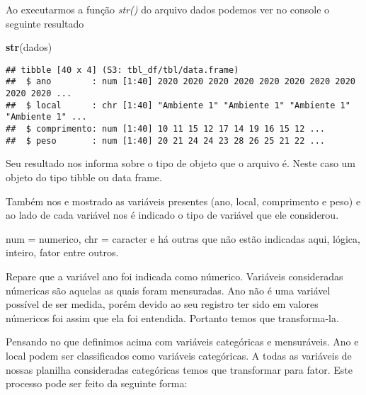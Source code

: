 \documentclass[]{book}
\newenvironment{Shaded}{\begin{snugshade}}{\end{snugshade}}
\newcommand{\KeywordTok}[1]{\textcolor[rgb]{0.13,0.29,0.53}{\textbf{#1}}}
\newcommand{\NormalTok}[1]{#1}
\newcommand{\OperatorTok}[1]{\textcolor[rgb]{0.81,0.36,0.00}{\textbf{#1}}}
\newcommand{\StringTok}[1]{\textcolor[rgb]{0.31,0.60,0.02}{#1}}
\begin{document}
Ao executarmos a função \emph{str()} do arquivo dados podemos ver no console o seguinte resultado

\begin{Shaded}
\begin{Highlighting}[]
\KeywordTok{str}\NormalTok{(dados)}
\end{Highlighting}
\end{Shaded}

\begin{verbatim}
## tibble [40 x 4] (S3: tbl_df/tbl/data.frame)
##  $ ano        : num [1:40] 2020 2020 2020 2020 2020 2020 2020 2020 2020 2020 ...
##  $ local      : chr [1:40] "Ambiente 1" "Ambiente 1" "Ambiente 1" "Ambiente 1" ...
##  $ comprimento: num [1:40] 10 11 15 12 17 14 19 16 15 12 ...
##  $ peso       : num [1:40] 20 21 24 24 23 28 26 25 21 22 ...
\end{verbatim}

Seu resultado nos informa sobre o tipo de objeto que o arquivo é. Neste caso um objeto do tipo tibble ou data frame.

Também nos e mostrado as variáveis presentes (ano, local, comprimento e peso) e ao lado de cada variável nos é indicado o tipo de variável que ele considerou.

num = numerico, chr = caracter e há outras que não estão indicadas aqui, lógica, inteiro, fator entre outros.

Repare que a variável ano foi indicada como númerico. Variáveis consideradas númericas são aquelas as quais foram mensuradas. Ano não é uma variável possível de ser medida, porém devido ao seu registro ter sido em valores númericos foi assim que ela foi entendida. Portanto temos que transforma-la.

Pensando no que definimos acima com variáveis categóricas e mensuráveis. Ano e local podem ser classificados como variáveis categóricas. A todas as variáveis de nossas planilha consideradas categóricas temos que transformar para fator. Este processo pode ser feito da seguinte forma:

\begin{Shaded}
\end{Shaded}
\end{document}
